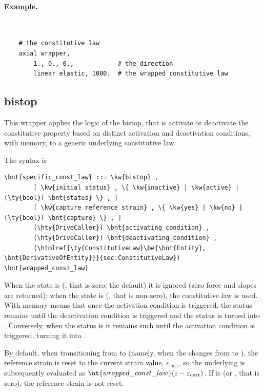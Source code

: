 \paragraph{Example.} \
\begin{verbatim}
    # the constitutive law
    axial wrapper,
        1., 0., 0.,            # the direction
        linear elastic, 1000.  # the wrapped constitutive law
\end{verbatim}


\subsection{bistop}
This wrapper applies the logic of the bistop, that is activate or deactivate
the constitutive property based on distinct activation and deactivation conditions, with memory,
to a generic underlying constitutive law.

The syntax is
\begin{Verbatim}[commandchars=\\\{\}]
    \bnt{specific_const_law} ::= \kw{bistop} ,
        [ \kw{initial status} , \{ \kw{inactive} | \kw{active} | (\ty{bool}) \bnt{status} \} , ]
        [ \kw{capture reference strain} , \{ \kw{yes} | \kw{no} | (\ty{bool}) \bnt{capture} \} , ]
        (\hty{DriveCaller}) \bnt{activating_condition} ,
        (\hty{DriveCaller}) \bnt{deactivating_condition} ,
        (\htmlref{\ty{ConstitutiveLaw}\be{\bnt{Entity}, \bnt{DerivativeOfEntity}}}{sec:ConstitutiveLaw}) \bnt{wrapped_const_law}
\end{Verbatim}
When the state is  (, that is zero; the default) it is ignored (zero force and slopes are returned);
when the state is  (\kw{true}, that is non-zero), the constitutive law is used.
With memory means that once the activation condition is triggered, the status remains  until the deactivation condition is triggered and the status is turned into .
Conversely, when the status is \kw{inactive} it remains such until the activation condition is triggered, turning it into \kw{active}.

By default, when transitioning from  to  (namely, when the  changes from  to ), the reference strain is reset to the current strain value, $\varepsilon_\text{curr}$, so the underlying  is subsequently evaluated as $\nt{wrapped\_const\_law}(\varepsilon - \varepsilon_\text{curr})$.  If  is  (or , that is zero), the reference strain is not reset.



